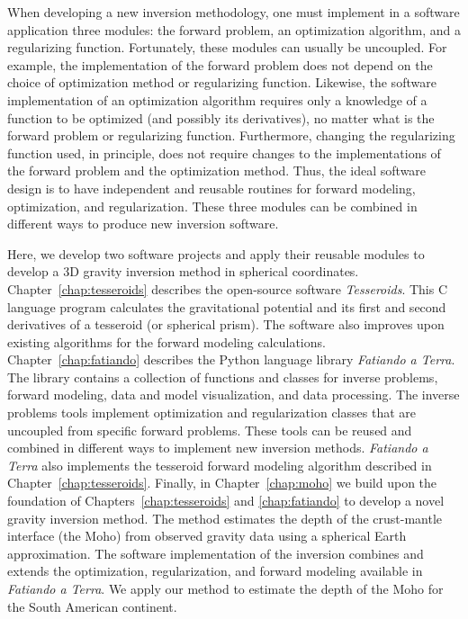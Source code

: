 When developing a new inversion methodology, one must implement in a software
application three modules: the forward problem, an optimization algorithm, and
a regularizing function.
Fortunately, these modules can usually be uncoupled.
For example, the implementation of the forward problem does not depend on the
choice of optimization method or regularizing function.
Likewise, the software implementation of an optimization algorithm requires
only a knowledge of a function to be optimized (and possibly its derivatives),
no matter what is the forward problem or regularizing function.
Furthermore, changing the regularizing function used, in principle, does not
require changes to the implementations of the forward problem and the
optimization method.
Thus, the ideal software design is to have independent and reusable routines
for forward modeling, optimization, and regularization.
These three modules can be combined in different ways to produce
new inversion software.

Here, we develop two software projects and apply their reusable modules to
develop a 3D gravity inversion method in spherical coordinates.
Chapter~\ref{chap:tesseroids} describes the open-source software
\textit{Tesseroids}.
This C language program calculates the gravitational potential and its first
and second derivatives of a tesseroid (or spherical prism).
The software also improves upon existing algorithms for the forward modeling
calculations.
Chapter~\ref{chap:fatiando} describes the Python language library
\textit{Fatiando a Terra}.
The library contains a collection of functions and classes for inverse
problems, forward modeling, data and model visualization, and data processing.
The inverse problems tools implement optimization and regularization classes
that are uncoupled from specific forward problems.
These tools can be reused and combined in different ways to implement new
inversion methods.
\textit{Fatiando a Terra} also implements the tesseroid forward modeling
algorithm described in Chapter~\ref{chap:tesseroids}.
Finally, in Chapter~\ref{chap:moho} we build upon the foundation of
Chapters~\ref{chap:tesseroids} and \ref{chap:fatiando} to develop a novel
gravity inversion method.
The method estimates the depth of the crust-mantle interface (the Moho) from
observed gravity data using a spherical Earth approximation.
The software implementation of the inversion combines and extends the
optimization, regularization, and forward modeling available in
\textit{Fatiando a Terra}.
We apply our method to estimate the depth of the Moho for the South American
continent.
